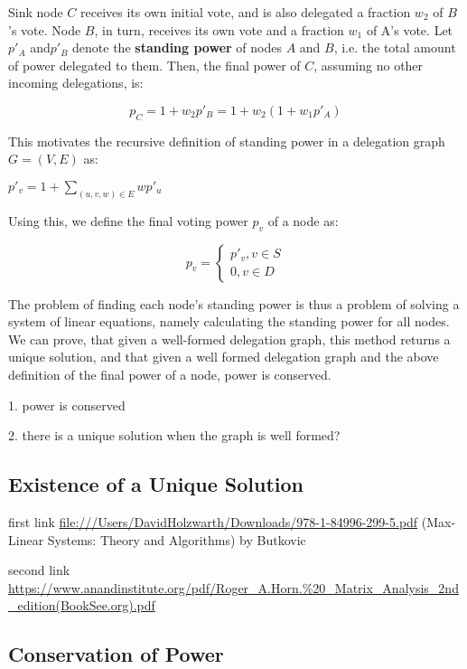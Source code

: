 Sink node $C$ receives its own initial vote, and is also delegated a fraction $w_2$ of $B$'s vote. Node $B$, in turn, receives its own vote and a fraction $w_1$ of A's vote. Let $p'_A$ and$ p'_B$ denote the \textbf{standing power} of nodes $A$ and $B$, i.e. the total amount of power delegated to them. Then, the final power of $C$, assuming no other incoming delegations, is:

\[
p_C = 1 + w_2p'_B = 1 + w_2(1 + w_1p'_A)
\]

This motivates the recursive definition of standing power in a delegation graph $G = (V, E)$ as:

$p'_v = 1 + \sum_{(u, v, w) \in E} wp'_u$

Using this, we define the final voting power $p_v$ of a node as:

\[
p_v = 
\begin{cases}
 p'_v, v \in S \\ 
 0, v \in D 
 \end{cases}
\]

The problem of finding each node's standing power is thus a problem of solving a system of linear equations, namely calculating the standing power for all nodes. We can prove, that given a well-formed delegation graph, this method returns a unique solution, and that given a well formed delegation graph and the above definition of the final power of a node, power is conserved.

1. power is conserved

2. there is a unique solution when the graph is well formed?

\subsection{Existence of a Unique Solution}


first link \url{file:///Users/DavidHolzwarth/Downloads/978-1-84996-299-5.pdf} (Max-Linear Systems: Theory and Algorithms) by Butkovic

second link \url{https://www.anandinstitute.org/pdf/Roger_A.Horn.%20_Matrix_Analysis_2nd_edition(BookSee.org).pdf}

 \subsection{Conservation of Power}
 
